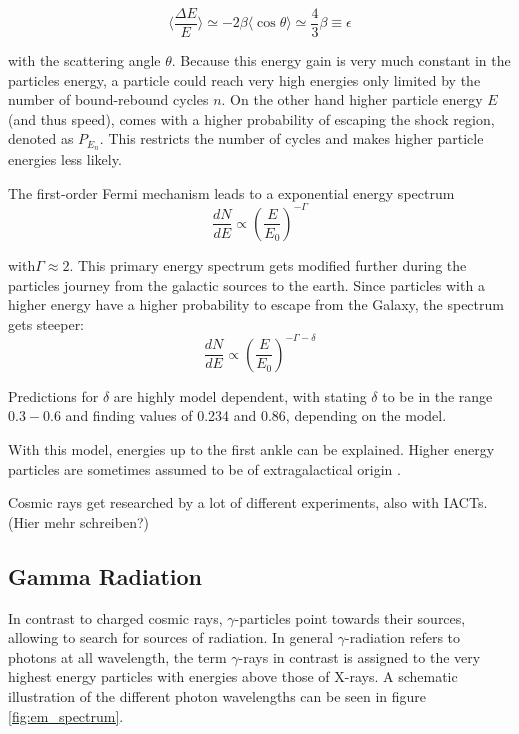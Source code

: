 \begin{equation}
	\langle \frac{\Delta E}{E} \rangle 
	\simeq -2\beta \langle \cos{\theta} \rangle
	\simeq \frac{4}{3}\beta
	\equiv \epsilon
\end{equation}

with the scattering angle $\theta$.
Because this energy gain is very much constant in the particles energy,
a particle could reach very high 
energies only limited by the number of bound-rebound cycles $n$.
On the other hand higher particle energy $E$ (and thus speed), 
comes with a higher probability of escaping the shock region, denoted 
as $P_{E_n}$. This restricts the number of cycles and makes 
higher particle energies less likely.

The first-order Fermi mechanism leads to a exponential energy spectrum 
\begin{equation}
	\frac{dN}{dE} \propto \left(\frac{E}{E_0}\right)^{-\Gamma}
\end{equation}

with$\Gamma \approx 2$.
This primary energy spectrum gets modified further during the particles 
journey from the galactic sources to the earth.
Since particles with a higher energy have a higher probability to escape 
from the Galaxy, the spectrum gets steeper:
\begin{equation}
	\frac{dN}{dE} \propto \left(\frac{E}{E_0}\right)^{-\Gamma-\delta}
\end{equation}

Predictions for $\delta$ are highly model dependent, with \cite{bookap}
stating $\delta$ to be in the range $0.3-0.6$ and \cite{refId0}
finding values of \num{0.234} and \num{0.86}, depending on the model.

With this model, energies up to the first ankle can be explained.
Higher energy particles are sometimes assumed to be of extragalactical origin
\cite{Baring:1997ka}.

Cosmic rays get researched by a lot of different experiments,
also with IACTs. 
(Hier mehr schreiben?)

\fi

\subsection{Gamma Radiation}
In contrast to charged cosmic rays, $\gamma$-particles point towards
their sources, allowing to search for sources of radiation.
In general $\gamma$-radiation refers to photons at all wavelength,
the term $\gamma$-rays in contrast is assigned to the very 
highest energy particles with energies above those of X-rays.
A schematic illustration of the different photon wavelengths
can be seen in figure \ref{fig:em_spectrum}.

